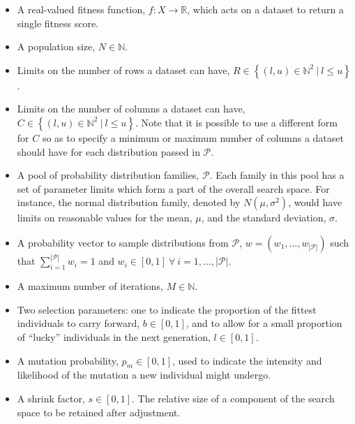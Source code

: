 \begin{itemize}
    \item A real-valued fitness function, \(f: X \to \mathbb{R}\), which acts on
        a dataset to return a single fitness score.
    \item A population size, \(N \in \mathbb{N}\).
    \item Limits on the number of rows a dataset can have,
        \(R \in \left\{(l, u) \in \mathbb{N}^2~|~l \leq u\right\}\).
    \item Limits on the number of columns a dataset can have,
        \(C \in \left\{(l, u) \in \mathbb{N}^2~|~l \leq u\right\}\). Note that
        it is possible to use a different form for \(C\) so as to specify a
        minimum or maximum number of columns a dataset should have for each
        distribution passed in \(\mathcal{P}\).
    \item A pool of probability distribution families, \(\mathcal{P}\). Each
        family in this pool has a set of parameter limits which form a part of
        the overall search space. For instance, the normal distribution family,
        denoted by \(N(\mu, \sigma^2)\), would have limits on reasonable values
        for the mean, \(\mu\), and the standard deviation, \(\sigma\).
    \item A probability vector to sample distributions from \(\mathcal{P}\),
        \(w = \left(w_1, \ldots, w_{|\mathcal{P}|}\right)\) such that
        \(\sum_{i=1}^{|\mathcal{P}|} w_i = 1\) and
        \(w_i \in [0, 1] \ \forall~i = 1, \ldots, |\mathcal{P}|\).
    \item A maximum number of iterations, \(M \in \mathbb{N}\).
    \item Two selection parameters: one to indicate the proportion of the 
        fittest individuals to carry forward, \(b \in [0, 1]\), and to allow for
        a small proportion of ``lucky'' individuals in the next generation,
        \(l \in [0, 1]\).
    \item A mutation probability, \(p_m \in [0, 1]\), used to indicate the
        intensity and likelihood of the mutation a new individual might undergo.
    \item A shrink factor, \(s \in [0, 1]\). The relative size of a component of
        the search space to be retained after adjustment.
\end{itemize}

\label{alg:edo}


